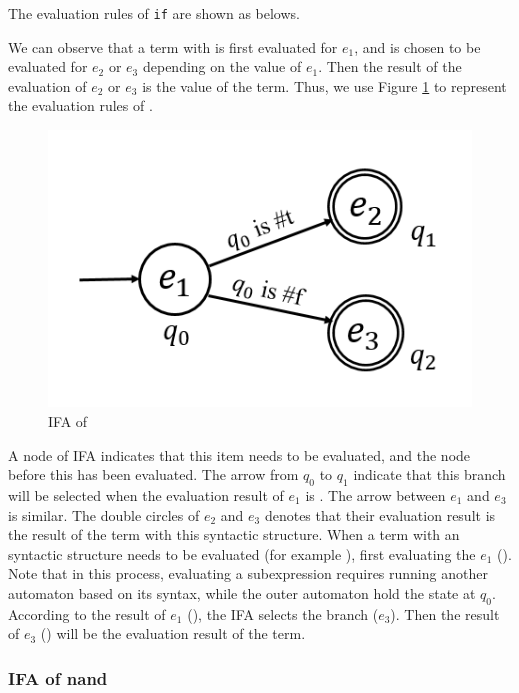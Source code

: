 The evaluation rules of \texttt{if} are shown as belows.

We can observe that a term with  is first evaluated for $e_1$, and is chosen to be evaluated for $e_2$ or $e_3$ depending on the value of $e_1$. Then the result of the evaluation of $e_2$ or $e_3$ is the value of the term. Thus, we use Figure \ref{fig:ifa-if} to represent the evaluation rules of .

\begin{figure}[t]
	\centering
	\includegraphics[scale=0.3]{images/ifa-if.png}
	\caption{IFA of }
	\label{fig:ifa-if}
\end{figure}

A node of IFA indicates that this item needs to be evaluated, and the node before this has been evaluated. The arrow from $q_0$ to $q_1$ indicate that this branch will be selected when the evaluation result of $e_1$ is . The arrow between $e_1$ and $e_3$ is similar. The double circles of $e_2$ and $e_3$ denotes that their evaluation result is the result of the term with this syntactic structure. When a term with an  syntactic structure needs to be evaluated (for example ), first evaluating the $e_1$ (). Note that in this process, evaluating a subexpression requires running another automaton based on its syntax, while the outer automaton hold the state at $q_0$. According to the result of $e_1$ (), the IFA selects the branch ($e_3$). Then the result of $e_3$ () will be the evaluation result of the term.

\subsubsection{IFA of nand}

